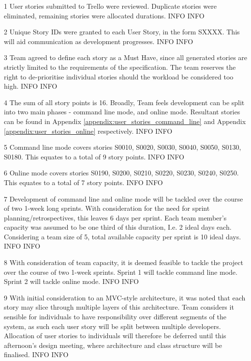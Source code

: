 \begin{momitems}
	\momitem
	{1}
	{User stories submitted to Trello were reviewed. Duplicate stories were eliminated, remaining stories were allocated durations.}
	{INFO}
	{INFO}
	
	\momitem
	{2}
	{Unique Story IDs were granted to each User Story, in the form SXXXX. This will aid communication as development progresses.}
	{INFO}
	{INFO}

	\momitem
	{3}
	{Team agreed to define each story as a Must Have, since all generated stories are strictly limited to the requirements of the specification. The team reserves the right to de-prioritise individual stories should the workload be considered too high.}
	{INFO}
	{INFO}

	\momitem
	{4}
	{The sum of all story points is 16. Broadly, Team feels development can be split into two main phases - command line mode, and online mode. Resultant stories can be found in Appendix \ref{appendix:user_stories_command_line} and Appendix \ref{appendix:user_stories_online} respectively.}
	{INFO}
	{INFO}

	\momitem
	{5}
	{Command line mode covers stories S0010, S0020, S0030, S0040, S0050, S0130, S0180. This equates to a total of 9 story points.}
	{INFO}
	{INFO}

	\momitem
	{6}
	{Online mode covers stories S0190, S0200, S0210, S0220, S0230, S0240, S0250. This equates to a total of 7 story points.}
	{INFO}
	{INFO}

	\momitem
	{7}
	{Development of command line and online mode will be tackled over the course of two 1-week long sprints. With consideration for the need for sprint planning/retrospectives, this leaves 6 days per sprint. Each team member's capacity was assumed to be one third of this duration, I.e. 2 ideal days each. Considering a team size of 5, total available capacity per sprint is 10 ideal days.}
	{INFO}
	{INFO}

	\momitem
	{8}
	{With consideration of team capacity, it is deemed feasible to tackle the project over the course of two 1-week sprints. Sprint 1 will tackle command line mode. Sprint 2 will tackle online mode.}
	{INFO}
	{INFO}

	\momitem
	{9}
	{With initial consideration to an MVC-style architecture, it was noted that each story may slice through multiple layers of this architecture. Team considers it sensible for individuals to have responsibility over different segments of the system, as such each user story will be split between multiple developers. Allocation of user stories to individuals will therefore be deferred until this afternoon's design meeting, where architecture and class structure will be finalised.}
	{INFO}
	{INFO}


\end{momitems}
